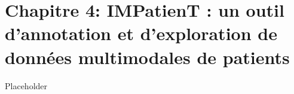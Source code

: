 \chapter*{Chapitre 4: IMPatienT : un outil d’annotation et d’exploration de données multimodales de patients}
Placeholder